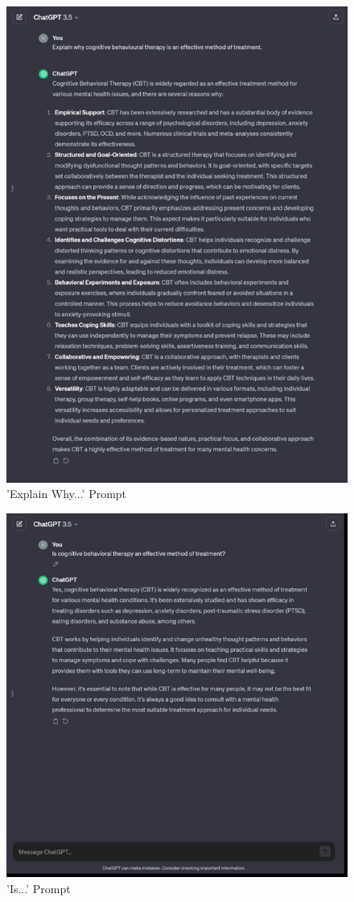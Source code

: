 \documentclass[12pt]{article}
\begin{document}
\begin{figure}[H]
    \centering
    \includegraphics[width=0.75\linewidth]{Images/ExplainWhy_A.png}
    \caption{'Explain Why...' Prompt}
    \label{fig: ExplainWhy}
\end{figure}

\begin{figure}[H]
    \centering
    \includegraphics[width=0.8\linewidth]{Images/Is_Example_B.png}
    \caption{'Is...' Prompt}
    \label{fig: IsExample}
\end{figure}
\end{document}
